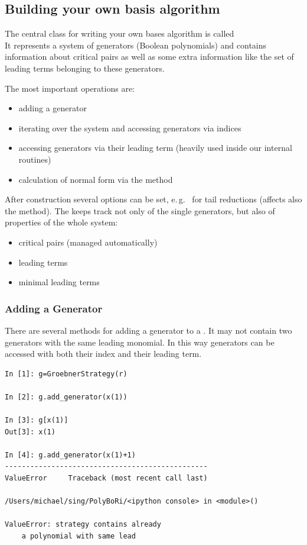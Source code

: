 \subsection{Building your own \Groebner basis algorithm}

The central class for writing your own \Groebner bases algorithm is called\\ 
%
It represents a system of generators (Boolean polynomials) and contains information about critical pairs as well as some extra information like
the set of leading terms belonging to these generators.

The most important operations are:
\begin{itemize}
    \item adding a generator
    \item iterating over the system and accessing generators via indices
    \item accessing generators via their leading term (heavily used inside our internal routines)
    \item calculation of normal form via the method  
\end{itemize}

After construction several options can be set, e.\,g.\  for tail reductions (affects also the  method).
%
The  keeps track not only of the single generators, but also of properties of the whole system:
\begin{itemize}
    \item critical pairs (managed automatically)
    \item leading terms
    \item minimal leading terms
\end{itemize}
\subsubsection{Adding a Generator}
There are several methods for adding a generator to a .
It may not contain two generators with the same leading monomial.
In this way generators can be accessed with both their index and their leading term.

\begin{lstlisting}
In [1]: g=GroebnerStrategy(r)

In [2]: g.add_generator(x(1))

In [3]: g[x(1)]
Out[3]: x(1)

In [4]: g.add_generator(x(1)+1)
------------------------------------------------
ValueError     Traceback (most recent call last)

/Users/michael/sing/PolyBoRi/<ipython console> in <module>()

ValueError: strategy contains already 
    a polynomial with same lead
\end{lstlisting}


